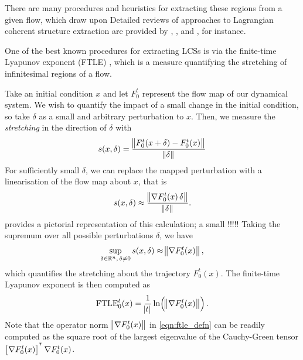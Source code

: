 There are many procedures and heuristics for extracting these regions from a given flow, which draw upon
Detailed reviews of approaches to Lagrangian coherent structure extraction are provided by \citet{BalasuriyaEtAl_2018_GeneralizedLagrangianCoherent}, \citet{HadjighasemEtAl_2017_CriticalComparisonLagrangian}, and \citet{PeacockDabiri_2010_IntroductionFocusIssue}, for instance.

One of the best known procedures for extracting LCSs is via the finite-time Lyapunov exponent (FTLE) \citep{ShaddenEtAl_2005_DefinitionPropertiesLagrangian}, which is a measure quantifying the stretching of infinitesimal regions of a flow.


Take an initial condition \(x\) and let \(F_0^t\) represent the flow map of our dynamical system.
We wish to quantify the impact of a small change in the initial condition, so take \(\delta\) as a small and arbitrary perturbation to \(x\).
Then, we measure the \emph{stretching} in the direction of \(\delta\) with
\[
	s\!\left(x, \delta\right) = \frac{\norm{F_0^t\!\left(x + \delta\right) - F_0^t\!\left(x\right)}}{\norm{\delta}}
\]
For sufficiently small \(\delta\), we can replace the mapped perturbation with a linearisation of the flow map about \(x\), that is
\[
	s\!\left(x, \delta\right) \approx \frac{\norm{\nabla F_0^t\!\left(x\right) \delta}}{\norm{\delta}}.
\]
 provides a pictorial representation of this calculation; a small !!!!!
Taking the supremum over all possible perturbations \(\delta\), we have
\[
	\sup_{\delta \in \mathbb{R}^n, \, \delta \neq 0}s\!\left(x, \delta\right) \approx \norm{\nabla F_0^t\!\left(x\right)},
\]
which quantifies the stretching about the trajectory \(F_0^t\!\left(x\right)\).
The finite-time Lyapunov exponent is then computed as
\begin{equation}
	\mathrm{FTLE}_0^t\!\left(x\right) = \frac{1}{\abs{t}}\ln\!\left(\norm{\nabla F_0^t\!\left(x\right)}\right).
	\label{eqn:ftle_defn}
\end{equation}
Note that the operator norm \(\norm{\nabla F_0^t\!\left(x\right)}\) in \cref{eqn:ftle_defn} can be readily computed as the square root of the largest eigenvalue of the Cauchy-Green tensor \(\left[\nabla F_0^t\!\left(x\right)\right]^{^{\intercal}}\nabla F_0^t\!\left(x\right)\).




